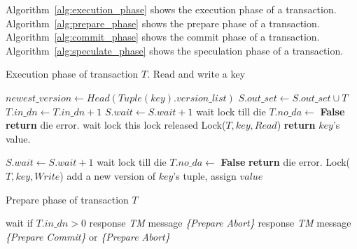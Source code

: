 \documentclass[conference]{IEEEtran}
\begin{document}
Algorithm~\ref{alg:execution_phase} shows the execution phase of a transaction. 
Algorithm~\ref{alg:prepare_phase} shows the prepare phase of a transaction. 
Algorithm~\ref{alg:commit_phase} shows the commit phase of a transaction. 
Algorithm~\ref{alg:speculate_phase} shows the speculation phase of a transaction. 
\begin{algorithm}[!h]

  \caption{Execution phase of transaction ${T}$. Read and write a key}
  
  \begin{algorithmic}[1]
      \State ${newest\_version \gets Head(Tuple(key).version\_list)}$
          \State ${S.out\_set \gets S.out\_set \cup T}$
          \State ${T.in\_dn \gets T.in\_dn + 1}$
        \EndIf 
      \EndIf
        \State ${S.wait \gets S.wait + 1}$
        \State wait lock till die
            \State ${T.no\_da \gets }$ \textbf{False}
            \State \textbf{return} die error.
        \EndIf
      \EndIf
        \State wait lock this lock released
      \EndIf
      \State Lock(${T, key, Read}$)
      \State \textbf{return} ${key}$'s value.

  \EndFunction
  \label{func:read}
  \end{algorithmic}


  \begin{algorithmic}[1]
        \State ${S.wait \gets S.wait + 1}$
      \EndIf
      \State wait lock till die
        \State ${T.no\_da \gets }$ \textbf{False}
        \State \textbf{return} die error.
      \EndIf
    \EndIf
    \State Lock(${T, key, Write}$)
    \State add a new version of ${key}$'s tuple, assign ${value}$
  \label{func:write}
  \EndFunction
  \end{algorithmic}
  \label{alg:execution_phase}
\end{algorithm}

\begin{algorithm}[!h]
  \caption{Prepare phase of transaction ${T}$}
  \begin{algorithmic}[1]
    \State wait if ${T.in\_dn > 0}$
      \State response \emph{TM} message \emph{\{Prepare Abort\}}
      \State response \emph{TM} message \emph{\{Prepare Commit\}} \newline or \emph{\{Prepare Abort\}}
    \EndIf 
  \EndFunction
  \end{algorithmic}
  \label{alg:prepare_phase}
\end{algorithm}
\end{document}
